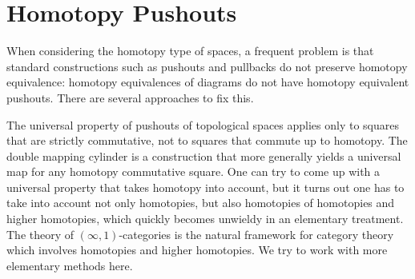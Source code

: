 \documentclass{scrartcl}
\theoremstyle{plain}
\theoremstyle{definition}
\DeclareMathOperator{\cone}{cone}
\DeclareMathOperator{\id}{id}
\DeclareMathOperator{\BC}{B}
\begin{document}






\section{Homotopy Pushouts}

When considering the homotopy type of spaces, a frequent problem is that standard constructions such as pushouts and pullbacks do not preserve homotopy equivalence: homotopy equivalences of diagrams do not have homotopy equivalent pushouts. There are several approaches to fix this. 

The universal property of pushouts of topological spaces applies only to squares that are strictly commutative, not to squares that commute up to homotopy. The double mapping cylinder is a construction that more generally yields a universal map for any homotopy commutative square. One can try to come up with a universal property that takes homotopy into account, but it turns out one has to take into account not only homotopies, but also homotopies of homotopies and higher homotopies, which quickly becomes unwieldy in an elementary treatment. The theory of $(\infty, 1)$-categories is the natural framework for category theory which involves homotopies and higher homotopies. We try to work with more elementary methods here.
\end{document}
